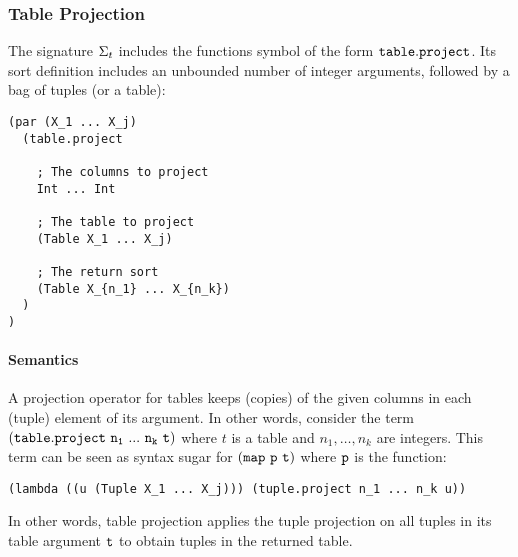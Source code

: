 \documentclass[english,a4paper,10pt]{article}
\begin{document}
\subsubsection{Table Projection}
The signature $\Sigma_{t}$ includes 
the functions symbol of the form
${\tt table.project}$.
Its sort definition includes an unbounded number of integer arguments, followed
by a bag of tuples (or a table):
\begin{verbatim}
(par (X_1 ... X_j) 
  (table.project
  
    ; The columns to project
    Int ... Int
  
    ; The table to project
    (Table X_1 ... X_j)
    
    ; The return sort
    (Table X_{n_1} ... X_{n_k})
  )
)
\end{verbatim}

\paragraph{Semantics}

A projection operator for tables keeps (copies) of the given columns
in each (tuple) element of its argument.
In other words,
consider the term $\syntax{(table.project\ n_1\ ...\ n_k\ t)}$
where $t$ is a table and $n_1, \ldots, n_k$ are integers.
This term
can be seen as syntax sugar for ${\tt (map\ p\ t)}$ where ${\tt p}$
is the function:
\begin{verbatim}
(lambda ((u (Tuple X_1 ... X_j))) (tuple.project n_1 ... n_k u))
\end{verbatim}
In other words, table projection
applies the tuple projection on all tuples in its table argument ${\tt t}$
to obtain tuples in the returned table.
\end{document}
